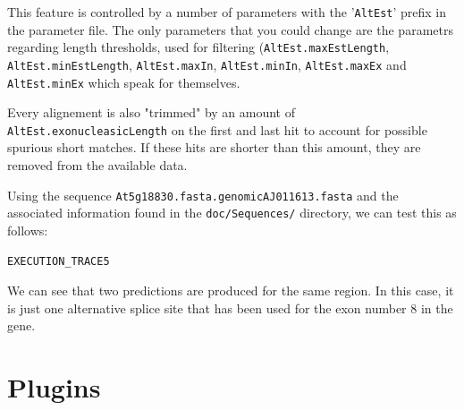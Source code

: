 \documentclass[a4paper,titlepage]{report}
\begin{document}
This feature is controlled by a number of parameters with the '\texttt{AltEst}'
prefix in the parameter file. The only parameters that you could change are the
parametrs regarding length thresholds, used for filtering (\texttt{AltEst.maxEstLength}, \texttt{AltEst.minEstLength}, \texttt{AltEst.maxIn}, \texttt{AltEst.minIn}, \texttt{AltEst.maxEx} and \texttt{AltEst.minEx} which speak for themselves.

Every alignement is also "trimmed" by an amount of \texttt{AltEst.exonucleasicLength} on the first and last hit to account for possible spurious short matches. If these hits are shorter than this amount, they are removed from the available data.

Using the sequence \texttt{At5g18830.fasta.genomicAJ011613.fasta} and the associated information found in
the \texttt{doc/Sequences/} directory, we can test this as follows:

\begin{Verbatim}[fontsize=\scriptsize]
EXECUTION_TRACE5
\end{Verbatim}

We can see that two predictions are produced for the same region. In this case, it is just one alternative splice site
that has been used for the exon number 8 in the gene.

\section{Plugins}
\label{plug}
\end{document}
